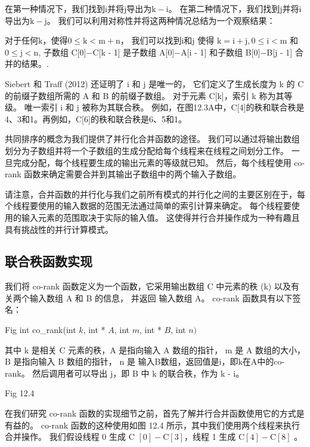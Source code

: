 在第一种情况下，我们找到$\mathrm{i}$并将$\mathrm{j}$导出为$\mathrm{k}-\mathrm{i}$。 
在第二种情况下，我们找到$\mathrm{j}$并将$\mathrm{i}$导出为$\mathrm{k}-\mathrm{j}$。 
我们可以利用对称性并将这两种情况总结为一个观察结果：

\begin{Observation}
对于任何$\mathrm{k}$，使得$0 \leq \mathrm{k}<\mathrm{m}+\mathrm{n}$，
我们可以找到$\mathrm{i}$和$\mathrm {j}$ 
使得 $\mathrm{k}=\mathrm{i}+\mathrm{j}, 0 \leq \mathrm{i}<\mathrm{m}$ 
和 $0 \leq \mathrm {j}<\mathrm{n}$, 
子数组 C[0]−C[k - 1] 是子数组 A[0]−A[i - 1] 和子数组 B[0]−B[j - 1] 合并的结果。.
\end{Observation}

Siebert 和 Traff (2012) 还证明了 i 和 j 是唯一的，
它们定义了生成长度为 k 的 C 的前缀子数组所需的 A 和 B 的前缀子数组。 对于元素 C[k]，索引 k 称为其等级。 
唯一索引 i 和 j 被称为其联合秩。 例如，在图12.3A中，C[4]的秩和联合秩是4、3和1。再例如，C[6]的秩和联合秩是6、5和1。

共同排序的概念为我们提供了并行化合并函数的途径。 
我们可以通过将输出数组划分为子数组并将一个子数组的生成分配给每个线程来在线程之间划分工作。 
一旦完成分配，每个线程要生成的输出元素的等级就已知。 
然后，每个线程使用 co-rank 函数来确定需要合并到其输出子数组中的两个输入子数组。

请注意，合并函数的并行化与我们之前所有模式的并行化之间的主要区别在于，每个线程要使用的输入数据的范围无法通过简单的索引计算来确定。 每个线程要使用的输入元素的范围取决于实际的输入值。 这使得并行合并操作成为一种有趣且具有挑战性的并行计算模式。

\subsection{联合秩函数实现}
我们将 co-rank 函数定义为一个函数，它采用输出数组 C 中元素的秩 (k) 以及有关两个输入数组 A 和 B 的信息，
并返回 输入数组 A。 co-rank 函数具有以下签名：

{\color{red} Fig}
int co\_rank(int $k$, int * $A$, int $m$, int * $B$, int $n)$

其中 $\mathrm{k}$ 是相关 $\mathrm{C}$ 元素的秩，$\mathrm{A}$ 是指向输入 $\mathrm{A}$ 数组的指针，
$\mathrm{ m}$ 是 $\mathrm{A}$ 数组的大小，$\mathrm{B}$ 是指向输入 $\mathrm{B}$ 数组的指针，
$\mathrm{n}$ 是 输入B数组，返回值是$\mathrm{i}$，即$\mathrm{k}$在A中的co-rank。
然后调用者可以导出 j，即 B 中 k 的联合秩，作为 k - i。

{\color{red} Fig 12.4}

在我们研究 co-rank 函数的实现细节之前，首先了解并行合并函数使用它的方式是有益的。 
co-rank 函数的这种使用如图 12.4 所示，其中我们使用两个线程来执行合并操作。 
我们假设线程 0 生成 $\mathrm{C}$ $[0]-\mathrm{C}[3]$，线程 1 生成 $\mathrm{C}[4]-\mathrm{C}[8]$ 。

